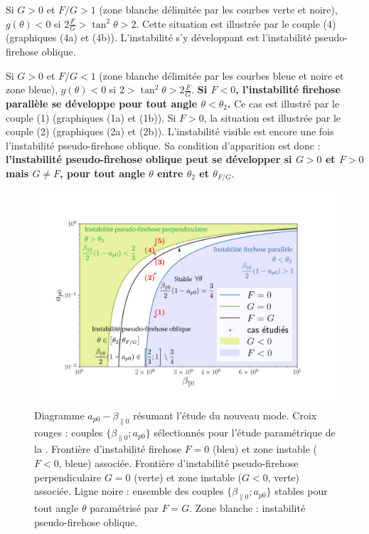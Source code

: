  Si $G>0$ et $F/G>1$ (zone blanche délimitée par les courbes verte et noire), $g(\theta) < 0$ si $2\frac{F}{G} > \tan^2 \theta > 2$. Cette situation est illustrée par le couple (4) (graphiques (4a) et (4b)). L'instabilité s'y développant est l'instabilité pseudo-firehose oblique. 
  
 Si $G>0$ et $F/G<1$ (zone blanche délimitée par les courbes bleue et noire et zone bleue), $g(\theta) < 0$ si $2 > \tan^2 \theta > 2\frac{F}{G}$. {\bf Si $F<0$, l'instabilité firehose parallèle se développe pour tout angle  $\theta < \theta_2$. } Ce cas est illustré par le couple (1) (graphiques (1a) et (1b)). Si $F>0$, la situation est illustrée par le couple (2) (graphiques (2a) et (2b)). L'instabilité visible est encore une fois l'instabilité pseudo-firehose oblique. Sa condition d'apparition est donc : {\bf l'instabilité pseudo-firehose oblique peut se développer si $G>0$ et $F>0$ mais $G\neq F$, pour tout angle $\theta$ entre $\theta_2$ et $\theta_{F/G}$}. 
 
 \begin{figure}[!ht]
  \centering
 \includegraphics[width=1\linewidth,trim=2cm 1cm 3cm 2cm, clip=true]{./Mainmatter/Part_2/images/diag_cas}
 \cprotect\caption{Diagramme \ensuremath{a_{p0}-\beta_{\parallel 0}} résumant l'étude du nouveau mode. Croix rouges : couples \ensuremath{\{\beta_{\parallel 0};a_{p0}\}} sélectionnés pour l'étude paramétrique de la . Frontière d'instabilité firehose \ensuremath{F=0} (bleu) et zone instable (\ensuremath{F<0}, bleue) associée. Frontière d'instabilité pseudo-firehose perpendiculaire \ensuremath{G=0} (verte) et zone instable (\ensuremath{G<0}, verte) associée. Ligne noire : ensemble des couples \ensuremath{\{\beta_{\parallel 0};a_{p0}\}} stables pour tout angle \ensuremath{\theta} paramétrisé par \ensuremath{F=G}. Zone blanche : instabilité pseudo-firehose oblique.}
 \label{fig:lin_cases_update}
 \end{figure}
 
